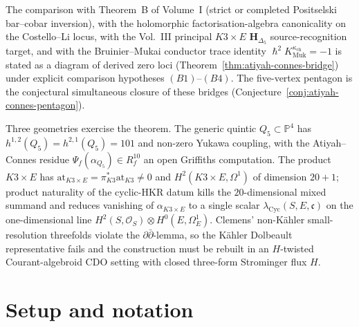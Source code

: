 \documentclass[11pt,reqno]{amsart}
\theoremstyle{plain}
\theoremstyle{definition}
\theoremstyle{remark}
\newcommand{\Pbb}{\mathbb{P}}
\newcommand{\cO}{\mathcal{O}}
\newcommand{\bfH}{\mathbf{H}}
\newcommand{\at}{\mathrm{at}}
\newcommand{\hbar}{{\hslash}}
\begin{document}
The comparison with Theorem~B of Volume~I (strict or completed
Positselski bar--cobar inversion), with the holomorphic
factorisation-algebra canonicality on the Costello--Li locus, with the
Vol.~III principal $K3\times E$ $\bfH_{\Delta_5}$
source-recognition target, and with the Bruinier--Mukai conductor trace identity
$\hbar^2K^{\kappa_{\mathrm{ch}}}_{\mathrm{Muk}}=-1$ is stated as a
diagram of derived zero loci
(Theorem~\ref{thm:atiyah-connes-bridge}) under explicit
comparison hypotheses $(B1)$--$(B4)$. The five-vertex pentagon is the
conjectural simultaneous closure of these bridges
(Conjecture~\ref{conj:atiyah-connes-pentagon}).

Three geometries exercise the theorem. The generic quintic
$Q_5\subset\Pbb^4$ has $h^{1,2}(Q_5)=h^{2,1}(Q_5)=101$ and non-zero
Yukawa coupling, with the Atiyah--Connes residue
$\Psi_f(\alpha_{Q_5})\in R_f^{10}$ an open Griffiths computation. The
product $K3\times E$ has
$\at_{K3\times E}=\pi_{K3}^*\at_{K3}\neq 0$ and
$H^2(K3\times E,\Omega^1)$ of dimension $20+1$; product naturality of
the cyclic-HKR datum kills the $20$-dimensional mixed summand and
reduces vanishing of $\alpha_{K3\times E}$ to a single scalar
$\lambda_{\mathrm{Cyc}}(S,E,\mathfrak c)$ on the one-dimensional line
$H^2(S,\cO_S)\otimes H^0(E,\Omega^1_E)$. Clemens' non-K\"ahler
small-resolution threefolds violate the $\partial\bar\partial$-lemma,
so the K\"ahler Dolbeault representative fails and the construction
must be rebuilt in an $H$-twisted Courant-algebroid CDO setting with
closed three-form Strominger flux $H$.

\section{Setup and notation}
\label{sec:setup}
\end{document}

